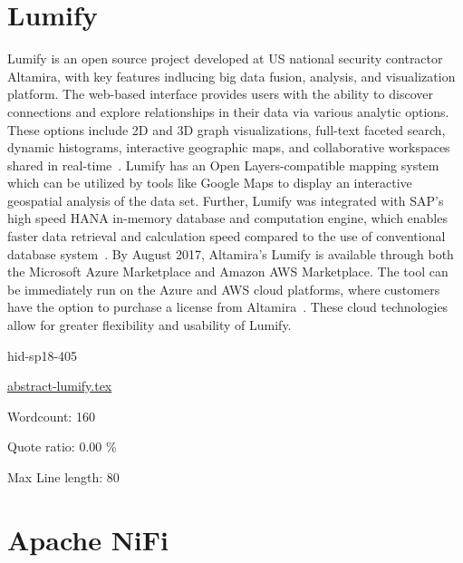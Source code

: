 \section{Lumify}

Lumify is an open source project developed at US national security
contractor Altamira, with key features indlucing big data fusion, 
analysis, and visualization platform. The web-based interface provides users 
with the ability to discover connections and explore relationships in their
data via various analytic options. These options include 2D and 3D
graph visualizations, full-text faceted search, dynamic histograms,
interactive geographic maps, and collaborative workspaces shared in
real-time~\cite{hid-sp18-405-www-lumify}. Lumify has an Open
Layers-compatible mapping system which can be utilized by tools like
Google Maps to display an interactive geospatial analysis of the data
set. Further, Lumify was integrated with SAP's high speed HANA
in-memory database and computation engine, which enables faster data
retrieval and calculation speed compared to the use of conventional
database system~\cite{hid-sp18-405-linkedinblog-lumify}. By August
2017, Altamira’s Lumify is available through both the Microsoft Azure
Marketplace and Amazon AWS Marketplace. The tool can be immediately
run on the Azure and AWS cloud platforms, where customers have the
option to purchase a license from 
Altamira~\cite{hid-sp18-405-wwwaws-lumify}\cite{hid-sp18-405-wwwazure-lumify}.
 These cloud technologies allow for greater flexibility and usability of Lumify.


\begin{IU}

hid-sp18-405

\href{https://github.com/cloudmesh-community/hid-sp18-405/blob/master//technology/abstract-lumify.tex}{abstract-lumify.tex}

 

Wordcount: 160


Quote ratio: 0.00 \%
 
Max Line length: 80
\end{IU}

\section{Apache NiFi}

